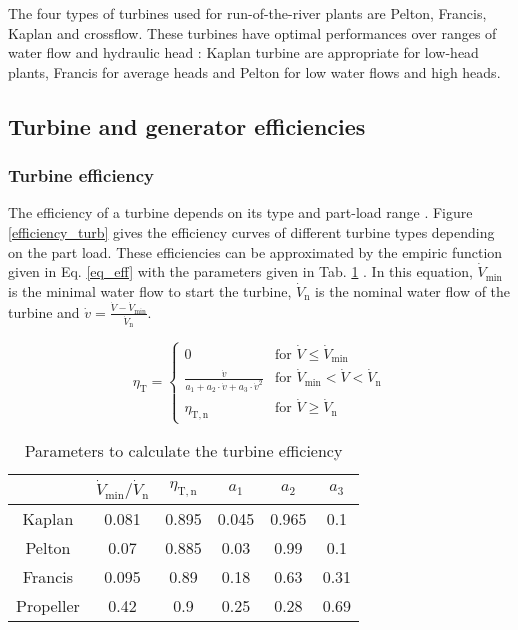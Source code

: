 The four types of turbines used for run-of-the-river plants are Pelton, Francis, Kaplan and crossflow. These turbines have optimal performances over ranges of water flow and hydraulic head : Kaplan turbine are appropriate for low-head plants, Francis for average heads and Pelton for low water flows and high heads.   

\subsection{Turbine and generator efficiencies}
\label{eff_turb_gen}

\subsubsection{Turbine efficiency}
The efficiency of a turbine depends on its type and part-load range \cite{quaschning}\cite{pacer}. Figure \ref{efficiency_turb} gives the efficiency curves of different turbine types depending on the part load. These efficiencies can be approximated by the empiric function given in Eq. \eqref{eq_eff} with the parameters given in Tab. \ref{eff_param} \cite{quaschning}. In this equation, $\dot{V}_\mathrm{min}$ is the minimal water flow to start the turbine, $\dot{V}_\mathrm{n}$ is the nominal water flow of the turbine and $\dot{v}=\frac{\dot{V}-\dot{V}_\mathrm{min}}{\dot{V}_\mathrm{n}}$.

\begin{equation}
 \label{eq_eff}
\eta_\mathrm{T}= \left\{
    \begin{array}{ll}
	0 & \mbox{for } \dot{V} \leq \dot{V}_\mathrm{min}\\
        \frac{\dot{v}}{a_\mathrm{1}+a_\mathrm{2} \cdot \dot{v} + a_\mathrm{3} \cdot \dot{v}^2} & \mbox{for } \dot{V}_\mathrm{min}<\dot{V}<\dot{V}_\mathrm{n} \\
        \eta_\mathrm{T,n} & \mbox{for } \dot{V} \geq \dot{V}_\mathrm{n}
    \end{array}
\right.
\end{equation}


\begin{table}[H]
 \centering
 \caption[Parameters to calculate the turbine efficiency]{Parameters to calculate the turbine efficiency \cite{quaschning}}
 \footnotesize
 \label{eff_param}
 \begin{tabular}{|c|c|c|c|c|c|}
  \cline{2-6}
  \multicolumn{1}{c|}{}&$\dot{V}_\mathrm{min} / \dot{V}_\mathrm{n}$ & $\eta_\mathrm{T,n}$& $a_\mathrm{1}$ & $a_\mathrm{2}$&$a_\mathrm{3}$ \\ 
  \hline
  Kaplan & 0.081& 0.895& 0.045 &0.965& 0.1 \\
  Pelton & 0.07& 0.885& 0.03& 0.99& 0.1\\
  Francis &0.095 &0.89 &0.18 &0.63 &0.31 \\
  Propeller &0.42 &0.9 &0.25 &0.28 &0.69\\
  \hline
 \end{tabular}
\end{table}

